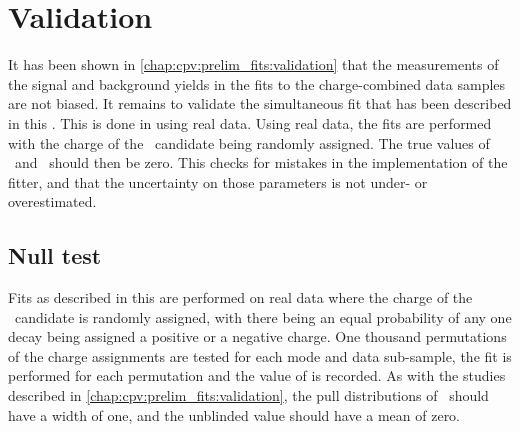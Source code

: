 \begin{table}
  \centering
  \caption{%
    Model parameters as determined in the preliminary fit to the 2012 magnet 
    down subset of the \pKK\ data.
  }
  \label{tab:cpv:araw:params:pKK}
  
\end{table}

\begin{table}
  \centering
  \caption{%
    Model parameters as determined in the preliminary fit to the 2012 magnet 
    down subset of the \ppipi\ data.
  }
  \label{tab:cpv:araw:params:ppipi}
  
\end{table}

\section{Validation}
\label{chap:cpv:araw:validation}

It has been shown in \cref{chap:cpv:prelim_fits:validation} that the 
measurements of the signal and background yields in the fits to the 
charge-combined data samples are not biased.
It remains to validate the simultaneous fit that has been described in this 
.
This is done in using real data.
Using real data, the fits are performed with the charge of the \PLambdac\ 
candidate being randomly assigned.
The true values of \ARaw\ and \ARawBg\ should then be zero.
This checks for mistakes in the implementation of the fitter, and that the 
uncertainty on those parameters is not under- or overestimated.

\subsection{Null test}
\label{chap:cpv:araw:validation:null}

Fits as described in this  are performed on real data 
where the charge of the \PLambdac\ candidate is randomly assigned, with there 
being an equal probability of any one decay being assigned a positive or a 
negative charge.
One thousand permutations of the charge assignments are tested for each mode 
and data sub-sample, the fit is performed for each permutation and the value of 
\ARaw is recorded.
As with the studies described in \cref{chap:cpv:prelim_fits:validation}, the 
pull distributions of \ARaw\ should have a width of one, and the unblinded 
value should have a mean of zero.

